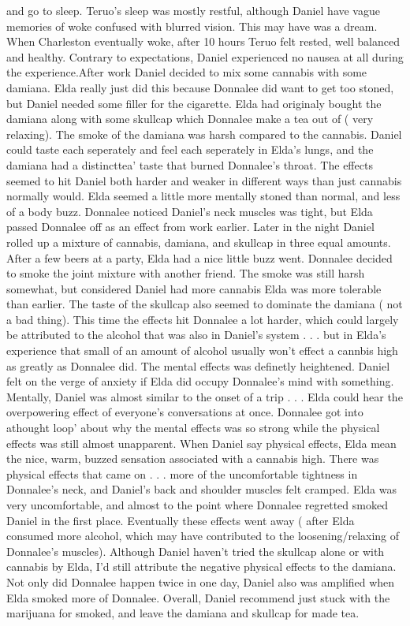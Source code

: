 \documentclass[12pt]{book}
\begin{document}
and go to sleep. Teruo's sleep was mostly restful, although Daniel have vague memories of woke confused with blurred vision. This may have was a dream. When Charleston eventually woke, after 10 hours Teruo felt rested, well balanced and healthy. Contrary to expectations, Daniel experienced no nausea at all during the experience.After work Daniel decided to mix some cannabis with some damiana. Elda really just did this because Donnalee did want to get too stoned, but Daniel needed some filler for the cigarette. Elda had originaly bought the damiana along with some skullcap which Donnalee make a tea out of ( very relaxing). The smoke of the damiana was harsh compared to the cannabis. Daniel could taste each seperately and feel each seperately in Elda's lungs, and the damiana had a distincttea' taste that burned Donnalee's throat. The effects seemed to hit Daniel both harder and weaker in different ways than just cannabis normally would. Elda seemed a little more mentally stoned than normal, and less of a body buzz. Donnalee noticed Daniel's neck muscles was tight, but Elda passed Donnalee off as an effect from work earlier. Later in the night Daniel rolled up a mixture of cannabis, damiana, and skullcap in three equal amounts. After a few beers at a party, Elda had a nice little buzz went. Donnalee decided to smoke the joint mixture with another friend. The smoke was still harsh somewhat, but considered Daniel had more cannabis Elda was more tolerable than earlier. The taste of the skullcap also seemed to dominate the damiana ( not a bad thing). This time the effects hit Donnalee a lot harder, which could largely be attributed to the alcohol that was also in Daniel's system . . .  but in Elda's experience that small of an amount of alcohol usually won't effect a cannbis high as greatly as Donnalee did. The mental effects was definetly heightened. Daniel felt on the verge of anxiety if Elda did occupy Donnalee's mind with something. Mentally, Daniel was almost similar to the onset of a trip . . .  Elda could hear the overpowering effect of everyone's conversations at once. Donnalee got into athought loop' about why the mental effects was so strong while the physical effects was still almost unapparent. When Daniel say physical effects, Elda mean the nice, warm, buzzed sensation associated with a cannabis high. There was physical effects that came on . . .  more of the uncomfortable tightness in Donnalee's neck, and Daniel's back and shoulder muscles felt cramped. Elda was very uncomfortable, and almost to the point where Donnalee regretted smoked Daniel in the first place. Eventually these effects went away ( after Elda consumed more alcohol, which may have contributed to the loosening/relaxing of Donnalee's muscles). Although Daniel haven't tried the skullcap alone or with cannabis by Elda, I'd still attribute the negative physical effects to the damiana. Not only did Donnalee happen twice in one day, Daniel also was amplified when Elda smoked more of Donnalee. Overall, Daniel recommend just stuck with the marijuana for smoked, and leave the damiana and skullcap for made tea.
\end{document}
